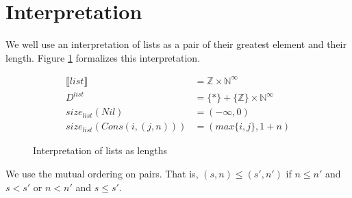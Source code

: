 \section{Interpretation}
%
We well use an interpretation of lists as a pair of their greatest element and
their length.  Figure \ref{fig:interp_sizes} formalizes this interpretation.
%
\begin{figure}[H]
  \caption{Interpretation of lists as lengths}
  \label{fig:interp_sizes}
  \begin{align*}
    \llbracket list \rrbracket &= \mathbb{Z} \times \mathbb{N}^\infty \\
    D^{list} &= \{\ast\} + \{\mathbb{Z}\} \times \mathbb{N}^\infty \\
    size_{list} (Nil) &= (-\infty,0) \\
    size_{list} (Cons(i,(j,n))) &= (max\{i,j\},1 + n)
  \end{align*}
\end{figure}
%
We use the mutual ordering on pairs.  That is, $(s,n) \leq (s',n')$ if
$n \leq n'$ and $s < s'$ or $n < n'$ and $s \leq s'$.

